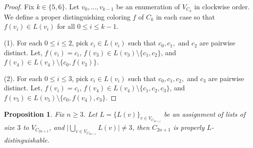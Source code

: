 \documentclass[12pt,reqno,a4paper]{amsart}
\theoremstyle{definition}
\newtheorem{prop}[defn]{Proposition}
\begin{document}
\begin{proof}
Fix $k\in\{5,6\}$. Let $v_{0},...,v_{k-1}$ be an enumeration of $V_{C_{k}}$ in clockwise order. We define a proper distinguishing coloring $f$ of $C_{k}$ 
in each case so that $f(v_{i})\in L(v_{i})$ for all $0\leq i\leq k-1$.

(1). For each $0\leq i\leq 2$, pick $c_i\in L(v_i)$ such that $c_{0}, c_{1},$ and $c_{2}$ are pairwise distinct. Let, 
$f(v_{i})=c_{i}$, $f(v_3)\in L(v_3)\setminus \{c_1,c_2\}$, and $f(v_4)\in L(v_4)\setminus\{c_0, f(v_3)\}$.     

(2). For each $0\leq i\leq 3$, pick $c_i\in L(v_i)$ such that $c_{0}, c_{1}, c_{2},$ and $c_{3}$ are pairwise distinct. Let,
   $f(v_{i})=c_{i}$, $f(v_4)\in L(v_4)\setminus \{c_1,c_2,c_3\}$, and $f(v_5)\in L(v_5)\setminus\{c_0, f(v_4), c_3\}$.  
\end{proof}

\begin{prop}\label{Proposition 2.4}
{\em Fix $n\geq 3$. Let $L=\{L(v)\}_{v\in V_{C_{2n+1}}}$ be an assignment of lists of size $3$ to $V_{C_{2n+1}}$, and $\vert \bigcup_{v\in V_{C_{2n+1}}} L(v)\vert \neq 3$, then $C_{2n+1}$ is properly $L$-distinguishable.}
\end{prop}
\end{document}

